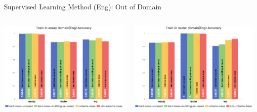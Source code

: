 \documentclass[serif]{beamer}
\begin{document}
\begin{frame}{Supervised Learning Method (Eng): Out of Domain}
\begin{columns}[t]
    \centering
    \includegraphics[width=\linewidth]{images/Train in essay domain(Eng) Accuracy.png}



    \centering
    \includegraphics[width=\linewidth]{images/Train in reuter domain(Eng) Accuracy.png}




\end{columns}
\end{frame}
\end{document}

